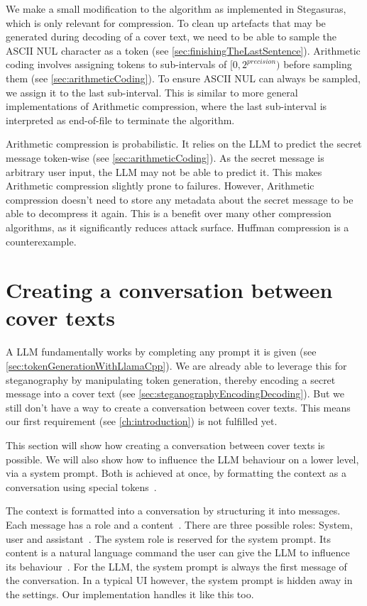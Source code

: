 We make a small modification to the algorithm as implemented in Stegasuras, which is only relevant for compression. To clean up artefacts that may be generated during decoding of a cover text, we need to be able to sample the ASCII NUL character as a token (see \cref{sec:finishingTheLastSentence}). Arithmetic coding involves assigning tokens to sub-intervals of $ [0, 2^{precision}) $ before sampling them (see \cref{sec:arithmeticCoding}). To ensure ASCII NUL can always be sampled, we assign it to the last sub-interval. This is similar to more general implementations of Arithmetic compression, where the last sub-interval is interpreted as end-of-file to terminate the algorithm.

Arithmetic compression is probabilistic. It relies on the \gls{LLM} to predict the secret message token-wise (see \cref{sec:arithmeticCoding}). As the secret message is arbitrary user input, the \gls{LLM} may not be able to predict it. This makes Arithmetic compression slightly prone to failures. However, Arithmetic compression doesn't need to store any metadata about the secret message to be able to decompress it again. This is a benefit over many other compression algorithms, as it significantly reduces attack surface. Huffman compression is a counterexample.

\section{Creating a conversation between cover texts}
\label{sec:creatingAConversationBetweenCoverTexts}
A \gls{LLM} fundamentally works by completing any prompt it is given (see \cref{sec:tokenGenerationWithLlamaCpp}). We are already able to leverage this for steganography by manipulating token generation, thereby encoding a secret message into a cover text (see \cref{sec:steganographyEncodingDecoding}). But we still don't have a way to create a conversation between cover texts. This means our first requirement (see \cref{ch:introduction}) is not fulfilled yet.

This section will show how creating a conversation between cover texts is possible. We will also show how to influence the \gls{LLM} behaviour on a lower level, via a system prompt. Both is achieved at once, by formatting the context as a conversation using special tokens~\cite{jiangChatBugCommonVulnerability2025}.

The context is formatted into a conversation by structuring it into messages. Each message has a role and a content~\cite{jiangChatBugCommonVulnerability2025}. There are three possible roles: System, user and assistant~\cite{jiangChatBugCommonVulnerability2025}. The system role is reserved for the system prompt. Its content is a natural language command the user can give the \gls{LLM} to influence its behaviour~\cite{jiangChatBugCommonVulnerability2025}. For the \gls{LLM}, the system prompt is always the first message of the conversation. In a typical \gls{UI} however, the system prompt is hidden away in the settings. Our implementation handles it like this too.

